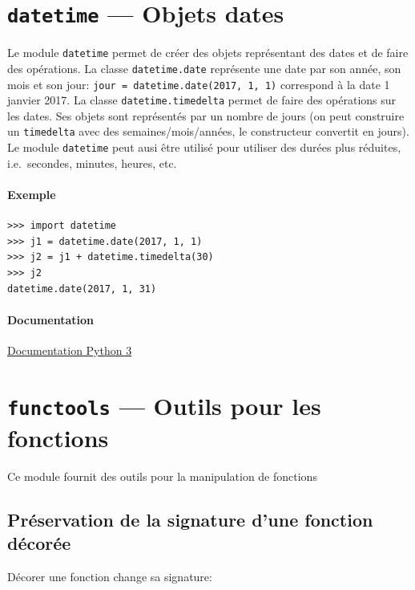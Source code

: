 \documentclass[a4paper, 10pt]{article}
\begin{document}



\section{\texttt{datetime} --- Objets dates}\label{datetime}

Le module \texttt{datetime} permet de créer des objets représentant des dates et de faire des opérations. La classe \texttt{datetime.date} représente une date par son année, son mois et son jour: \texttt{jour = datetime.date(2017, 1, 1)} correspond à la date 1\ier{} janvier 2017.
La classe \texttt{datetime.timedelta} permet de faire des opérations sur les dates. Ses objets sont représentés par un nombre de jours (on peut construire un \texttt{timedelta} avec des semaines/mois/années, le constructeur convertit en jours).
Le module \texttt{datetime} peut ausi être utilisé pour utiliser des durées plus réduites, i.e.\ secondes, minutes, heures, etc.

\paragraph{Exemple}
\begin{verbatim}
>>> import datetime
>>> j1 = datetime.date(2017, 1, 1)
>>> j2 = j1 + datetime.timedelta(30)
>>> j2
datetime.date(2017, 1, 31)
\end{verbatim}


\paragraph*{Documentation} \href{https://docs.python.org/fr/3/library/datetime.html}{Documentation Python 3}

\section{\texttt{functools} --- Outils pour les fonctions}
Ce module fournit des outils pour la manipulation de fonctions

\subsection{Préservation de la signature d'une fonction décorée}
Décorer une fonction change sa signature:
\end{document}

